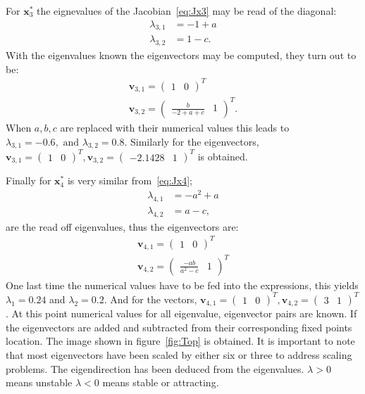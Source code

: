 For $\mathbf{x}_3^*$ the eignevalues of the Jacobian~\ref{eq:Jx3} may be read of the diagonal:
\begin{align}
\lambda_{3,1} &= -1+a \\
\lambda_{3,2} &= 1-c. 
\end{align}
With the eigenvalues known the eigenvectors may be  computed, they turn out to be:
\begin{align}
 \mathbf{v}_{3,1} = \begin{pmatrix} 1 & 0 \end{pmatrix}^T \\
\mathbf{v}_{3,2} = \begin{pmatrix}  \frac{b}{-2+a+c} & 1 \end{pmatrix}^T.
\end{align}
When $a,b,c$ are replaced with their numerical values this leads to $\lambda_{3,1} = -0.6, \text{ and } \lambda_{3,2} = 0.8 $. Similarly for the eigenvectors, $\mathbf{v}_{3,1} = \begin{pmatrix} 1 & 0 \end{pmatrix}^T,
\mathbf{v}_{3,2} = \begin{pmatrix} -2.1428& 1 \end{pmatrix}^T$ is obtained. 

Finally for $\mathbf{x}_4^*$ is very similar from~\ref{eq:Jx4};
\begin{align}
\lambda_{4,1} &= -a^2 + a \\
\lambda_{4,2} &= a-c,
\label{eq:eig4}
\end{align}
are the read off eigenvalues, thus the eigenvectors are:
\begin{align}
 \mathbf{v}_{4,1} = \begin{pmatrix} 1 & 0 \end{pmatrix}^T \\
 \mathbf{v}_{4,2} = \begin{pmatrix} \frac{-ab}{a^2-c} & 1 \end{pmatrix}^T
 \label{eq:vec4}
\end{align}
One last time the numerical values have to be fed into the expressions, this yields $\lambda_1 = 0.24$ and $\lambda_2 = 0.2$. And for the vectors, $ \mathbf{v}_{4,1} = \begin{pmatrix} 1 & 0 \end{pmatrix}^T,
 \mathbf{v}_{4,2} = \begin{pmatrix} 3 & 1 \end{pmatrix}^T$. At this point numerical values for all eigenvalue, eigenvector pairs are known. If the eigenvectors are added and subtracted from their corresponding fixed points location. The image shown in figure~\ref{fig:Top} is obtained. It is important to note that most eigenvectors have been scaled by either six or three to address scaling problems. The eigendirection has been deduced from the eigenvalues. $\lambda > 0$ means unstable $\lambda < 0$ means stable or attracting.

